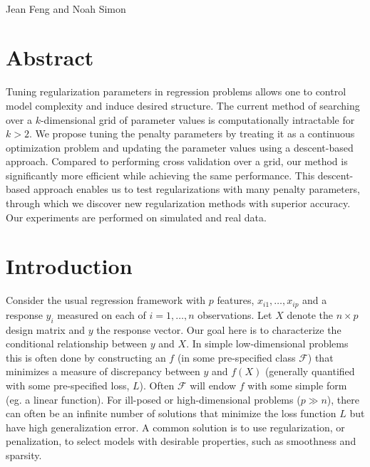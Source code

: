 \documentclass[10pt,letterpaper]{article}
\date{}
\begin{document}
\vspace*{0.35in}

\begin{flushleft}
{\Large
\textbf{}
}
\newline
\\
Jean Feng and Noah Simon
\\

\end{flushleft}
\section*{Abstract}
Tuning regularization parameters in regression problems allows one to control model complexity and induce desired structure. The current method of searching over a $k$-dimensional grid of parameter values is computationally intractable for $k>2$. We propose tuning the penalty parameters by treating it as a continuous optimization problem and updating the parameter values using a descent-based approach. Compared to performing cross validation over a grid, our method is significantly more efficient while achieving the same performance. This descent-based approach enables us to test regularizations with many penalty parameters, through which we discover new regularization methods with superior accuracy. Our experiments are performed on simulated and real data.

\section{Introduction}

Consider the usual regression framework with $p$ features, $x_{i1},\ldots,x_{ip}$ and a response $y_i$ measured on each of $i=1,\ldots,n$ observations. Let $X$ denote the $n \times p$ design matrix and $y$ the response vector. Our goal here is to characterize the conditional relationship between $y$ and $X$. In simple low-dimensional problems this is often done by constructing an $f$ (in some pre-specified class $\mathcal{F}$) that minimizes a measure of discrepancy between $y$ and $f(X)$ (generally quantified with some pre-specified loss, $L$). Often $\mathcal{F}$ will endow $f$ with some simple form (eg. a linear function). For ill-posed or high-dimensional problems ($p \gg n$), there can often be an infinite number of solutions that minimize the loss function $L$ but have high generalization error. A common solution is to use regularization, or penalization, to select models with desirable properties, such as smoothness and sparsity.
\end{document}
